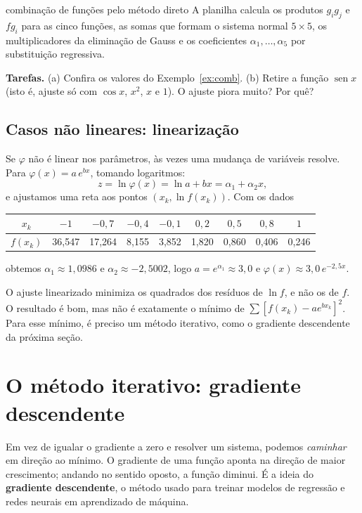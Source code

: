 \begin{atividade}{combinação de funções pelo método direto}{\arqMMQComb}
A planilha calcula os produtos $g_ig_j$ e $fg_i$ para as cinco funções, as somas que formam o sistema
normal $5\times5$, os multiplicadores da eliminação de Gauss e os coeficientes $\alpha_1,\dots,\alpha_5$
por substituição regressiva.

\textbf{Tarefas.} (a) Confira os valores do Exemplo~\ref{ex:comb}. (b) Retire a função $\operatorname{sen}x$
(isto é, ajuste só com $\cos x$, $x^2$, $x$ e $1$). O ajuste piora muito? Por quê?
\end{atividade}

\subsection{Casos não lineares: linearização}

Se $\varphi$ não é linear nos parâmetros, às vezes uma mudança de variáveis resolve. Para
$\varphi(x)=a\,e^{bx}$, tomando logaritmos:
\[
z=\ln\varphi(x)=\ln a+bx=\alpha_1+\alpha_2x,
\]
e ajustamos uma reta aos pontos $(x_k,\ln f(x_k))$. Com os dados
\begin{center}\small
\begin{tabular}{c|cccccccc}
$x_k$ & $-1$ & $-0{,}7$ & $-0{,}4$ & $-0{,}1$ & $0{,}2$ & $0{,}5$ & $0{,}8$ & $1$\\ \hline
$f(x_k)$ & 36,547 & 17,264 & 8,155 & 3,852 & 1,820 & 0,860 & 0,406 & 0,246
\end{tabular}
\end{center}
obtemos $\alpha_1\approx1{,}0986$ e $\alpha_2\approx-2{,}5002$, logo $a=e^{\alpha_1}\approx3{,}0$ e
$\varphi(x)\approx3{,}0\,e^{-2{,}5x}$.

\begin{observacao}
O ajuste linearizado minimiza os quadrados dos resíduos de $\ln f$, e não os de $f$. O resultado é bom,
mas não é exatamente o mínimo de $\sum[f(x_k)-a e^{bx_k}]^2$. Para esse mínimo, é preciso um método
iterativo, como o gradiente descendente da próxima seção.
\end{observacao}

\section{O método iterativo: gradiente descendente}

Em vez de igualar o gradiente a zero e resolver um sistema, podemos \emph{caminhar} em direção ao mínimo.
O gradiente de uma função aponta na direção de maior crescimento; andando no sentido oposto, a função
diminui. É a ideia do \textbf{gradiente descendente}, o método usado para treinar modelos de regressão
e redes neurais em aprendizado de máquina.

